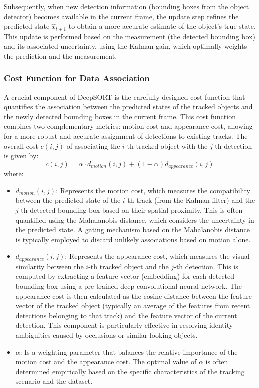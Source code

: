 Subsequently, when new detection information (bounding boxes from the object detector) becomes available in the current frame, the update step refines the predicted state $\hat{x}_{t+1}$ to obtain a more accurate estimate of the object's true state. This update is performed based on the measurement (the detected bounding box) and its associated uncertainty, using the Kalman gain, which optimally weights the prediction and the measurement.

\subsubsection{Cost Function for Data Association}

A crucial component of DeepSORT is the carefully designed cost function that quantifies the association between the predicted states of the tracked objects and the newly detected bounding boxes in the current frame. This cost function combines two complementary metrics: motion cost and appearance cost, allowing for a more robust and accurate assignment of detections to existing tracks. The overall cost $c(i, j)$ of associating the $i$-th tracked object with the $j$-th detection is given by:
$$
c(i, j) = \alpha \cdot d_{motion}(i, j) + (1 - \alpha) d_{appearance}(i, j)
$$
where:
\begin{itemize}
    \item $d_{motion}(i, j)$: Represents the motion cost, which measures the compatibility between the predicted state of the $i$-th track (from the Kalman filter) and the $j$-th detected bounding box based on their spatial proximity. This is often quantified using the Mahalanobis distance, which considers the uncertainty in the predicted state. A gating mechanism based on the Mahalanobis distance is typically employed to discard unlikely associations based on motion alone.

    \item $d_{appearance}(i, j)$: Represents the appearance cost, which measures the visual similarity between the $i$-th tracked object and the $j$-th detection. This is computed by extracting a feature vector (embedding) for each detected bounding box using a pre-trained deep convolutional neural network. The appearance cost is then calculated as the cosine distance between the feature vector of the tracked object (typically an average of the features from recent detections belonging to that track) and the feature vector of the current detection. This component is particularly effective in resolving identity ambiguities caused by occlusions or similar-looking objects.

    \item $\alpha$: Is a weighting parameter that balances the relative importance of the motion cost and the appearance cost. The optimal value of $\alpha$ is often determined empirically based on the specific characteristics of the tracking scenario and the dataset.
\end{itemize}

